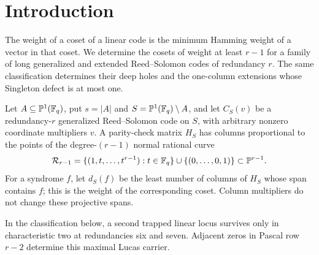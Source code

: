 \section{Introduction}

The weight of a coset of a linear code is the minimum Hamming weight of a
vector in that coset.  We determine the cosets of weight at least \(r-1\) for
a family of long generalized and extended Reed--Solomon codes of redundancy
\(r\).  The same classification determines their deep holes and the
one-column extensions whose Singleton defect is at most one.

Let \(A\subseteq\mathbb P^1(\mathbb F_q)\), put \(s=|A|\) and
\(S=\mathbb P^1(\mathbb F_q)\setminus A\), and let \(C_S(v)\) be a redundancy-\(r\)
generalized Reed--Solomon code on \(S\), with arbitrary nonzero coordinate
multipliers \(v\).  A parity-check matrix \(H_S\) has columns proportional to
the points of the degree-\((r-1)\) normal rational curve
\[
  \mathcal R_{r-1}=\{(1,t,\ldots,t^{r-1}):t\in\mathbb F_q\}
              \cup\{(0,\ldots,0,1)\}\subset\mathbb P^{r-1}.
\]
For a syndrome \(f\), let \(d_S(f)\) be the least number of columns of \(H_S\)
whose span contains \(f\); this is the weight of the corresponding coset.
Column multipliers do not change these projective spans.

In the classification below, a second trapped linear locus survives only in
characteristic two at redundancies six and seven.  Adjacent zeros in Pascal
row \(r-2\) determine this maximal Lucas carrier.

